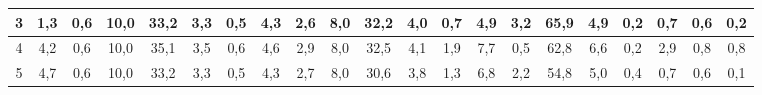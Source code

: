 \begin{sidewaystable}[]
\begin{tabular}{|c|c|c|c|c|c|c|c|c|c|c|c|c|c|c|c|c|c|c|c|c|}
    3  &  1,3                                              & 0,6                                              & 10,0                                             & 33,2                                             & 3,3                                              & 0,5                                              & 4,3                                              & 2,6                                              & 8,0                                              & 32,2                                             & 4,0                                              & 0,7                                              & 4,9                                              & 3,2                                              & 65,9                                             & 4,9                                              & 0,2                                              & 0,7                                              & 0,6                                              & 0,2                                              \\ \hline
    4  &  4,2                                              & 0,6                                              & 10,0                                             & 35,1                                             & 3,5                                              & 0,6                                              & 4,6                                              & 2,9                                              & 8,0                                              & 32,5                                             & 4,1                                              & 1,9                                              & 7,7                                              & 0,5                                              & 62,8                                             & 6,6                                              & 0,2                                              & 2,9                                              & 0,8                                              & 0,8                                              \\ \hline
    5  &  4,7                                              & 0,6                                              & 10,0                                             & 33,2                                             & 3,3                                              & 0,5                                              & 4,3                                              & 2,7                                              & 8,0                                              & 30,6                                             & 3,8                                              & 1,3                                              & 6,8                                              & 2,2                                              & 54,8                                             & 5,0                                              & 0,4                                              & 0,7                                              & 0,6                                              & 0,1                                              \\ \hline

\end{tabular}
\end{sidewaystable}
